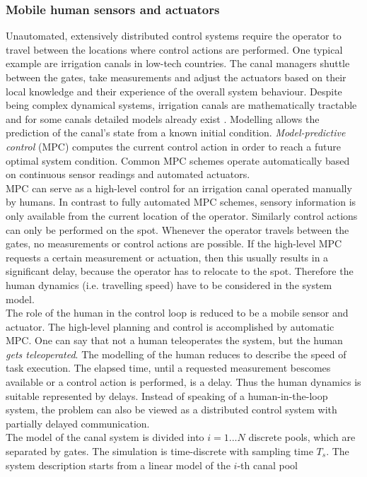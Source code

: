\documentclass[a4paper,twoside, openright,12pt]{report}
\begin{document}
\subsubsection{Mobile human sensors and actuators}
Unautomated, extensively distributed control systems require the operator to travel between the locations where control actions are performed. One typical example are irrigation canals in low-tech countries. The canal managers shuttle between the gates, take measurements and adjust the actuators based on their local knowledge and their experience of the overall system behaviour. Despite being complex dynamical systems, irrigation canals are mathematically tractable and for some canals detailed models already exist \cite{vanOverloop2015}. Modelling allows the prediction of the canal's state from a known initial condition. \emph{Model-predictive control} (MPC) computes the current control action in order to reach a future optimal system condition. Common MPC schemes operate automatically based on continuous sensor readings and automated actuators.\\
MPC can serve as a high-level control for an irrigation canal operated manually by humans. In contrast to fully automated MPC schemes, sensory information is only available from the current location of the operator. Similarly control actions can only be performed on the spot. Whenever the operator travels between the gates, no measurements or control actions are possible. If the high-level MPC requests a certain measurement or actuation, then this usually results in a significant delay, because the operator has to relocate to the spot. Therefore the human dynamics (i.e. travelling speed) have to be considered in the system model. \\
The role of the human in the control loop is reduced to be a mobile sensor and actuator. The high-level planning and control is accomplished by automatic MPC. One can say that not a human teleoperates the system, but the human \emph{gets teleoperated}. The modelling of the human reduces to describe the speed of task execution. The elapsed time, until a requested measurement bescomes available or a control action is performed, is a delay. Thus the human dynamics is suitable represented by delays. Instead of speaking of a human-in-the-loop system, the problem can also be viewed as a distributed control system with partially delayed communication.\\
The model of the canal system is divided into $i=1...N$ discrete pools, which are separated by gates. The simulation is time-discrete with sampling time $T_s$. The system description starts from a linear model of the $i$-th canal pool
\end{document}
